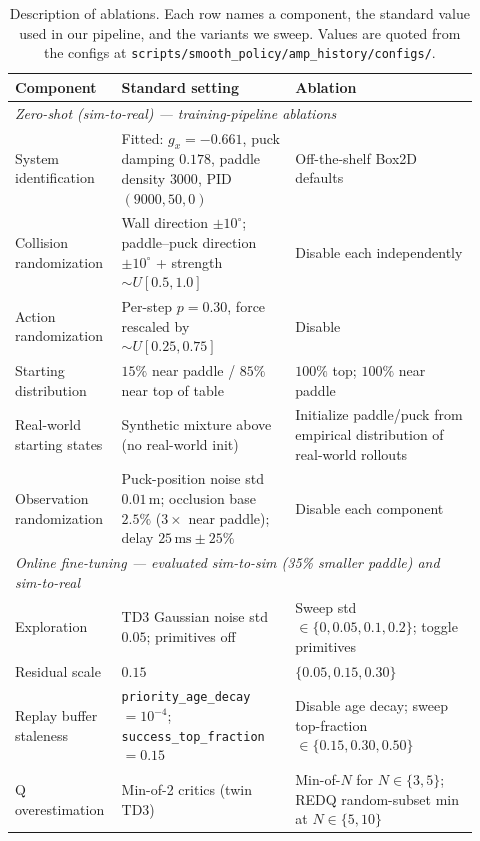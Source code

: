 \documentclass{article}
\begin{document}
\begin{table}[t]
\centering
\caption{Description of ablations. Each row names a component, the standard value used in our pipeline, and the variants we sweep. Values are quoted from the configs at \texttt{scripts/smooth\_policy/amp\_history/configs/}.}
\label{tab:ablations}
\small
\begin{tabular}{p{0.18\linewidth} p{0.36\linewidth} p{0.38\linewidth}}
\toprule
\textbf{Component} & \textbf{Standard setting} & \textbf{Ablation} \\
\midrule
\multicolumn{3}{l}{\textit{Zero-shot (sim-to-real) --- training-pipeline ablations}} \\
\midrule
System identification & Fitted: $g_x{=}-0.661$, puck damping $0.178$, paddle density $3000$, PID $(9000, 50, 0)$ & Off-the-shelf Box2D defaults \\
Collision randomization & Wall direction $\pm 10^\circ$; paddle--puck direction $\pm 10^\circ$ + strength $\sim U[0.5, 1.0]$ & Disable each independently \\
Action randomization & Per-step $p{=}0.30$, force rescaled by $\sim U[0.25, 0.75]$ & Disable \\
Starting distribution & $15\%$ near paddle / $85\%$ near top of table & $100\%$ top; $100\%$ near paddle \\
Real-world starting states & Synthetic mixture above (no real-world init) & Initialize paddle/puck from empirical distribution of real-world rollouts \\
Observation randomization & Puck-position noise std $0.01$\,m; occlusion base $2.5\%$ ($3\times$ near paddle); delay $25\,\text{ms} \pm 25\%$ & Disable each component \\
\midrule
\multicolumn{3}{l}{\textit{Online fine-tuning --- evaluated sim-to-sim (35\% smaller paddle) and sim-to-real}} \\
\midrule
Exploration & TD3 Gaussian noise std $0.05$; primitives off & Sweep std $\in \{0, 0.05, 0.1, 0.2\}$; toggle primitives \\
Residual scale & $0.15$ & $\{0.05, 0.15, 0.30\}$ \\
Replay buffer staleness & \texttt{priority\_age\_decay} $= 10^{-4}$; \texttt{success\_top\_fraction} $= 0.15$ & Disable age decay; sweep top-fraction $\in \{0.15, 0.30, 0.50\}$ \\
Q overestimation & Min-of-2 critics (twin TD3) & Min-of-$N$ for $N \in \{3, 5\}$; REDQ random-subset min at $N \in \{5, 10\}$ \\
\bottomrule
\end{tabular}
\end{table}
\end{document}
